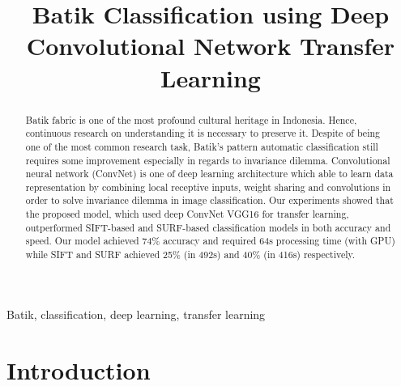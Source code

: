 \documentclass[conference]{IEEEtran}
\begin{document}
%
\title{Batik Classification using Deep Convolutional Network Transfer Learning}


\author{

\and
{}

}

\maketitle


\begin{abstract}
Batik fabric is one of the most profound cultural heritage in Indonesia. Hence, continuous research on understanding it is necessary to preserve it. Despite of being one of the most common research task, Batik's pattern automatic classification still requires some improvement especially in regards to invariance dilemma. Convolutional neural network (ConvNet) is one of deep learning architecture which able to learn data representation by combining local receptive inputs, weight sharing and convolutions in order to solve invariance dilemma in image classification. Our experiments showed that the proposed model, which used deep ConvNet VGG16 for transfer learning, outperformed SIFT-based and SURF-based classification models in both accuracy and speed. Our model achieved 74\% accuracy and required 64s processing time (with GPU) while SIFT and SURF achieved 25\% (in 492s) and 40\% (in 416s) respectively. 
\end{abstract}

\begin{IEEEkeywords}
Batik, classification, deep learning, transfer learning
\end{IEEEkeywords}

\section{Introduction}
\end{document}
